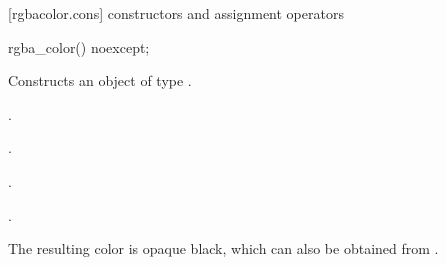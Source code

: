  [rgbacolor.cons] { constructors and assignment operators}

\begin{itemdecl}
	rgba_color() noexcept;
\end{itemdecl}
\begin{itemdescr}
	\pnum
	\effects
	Constructs an object of type .
	
	\pnum
	\postconditions
	.
	
	\pnum
	.
	
	\pnum
	.
	
	\pnum
	.
	
	\pnum
	\realnote
	The resulting color is opaque black, which can also be obtained from .
\end{itemdescr}

